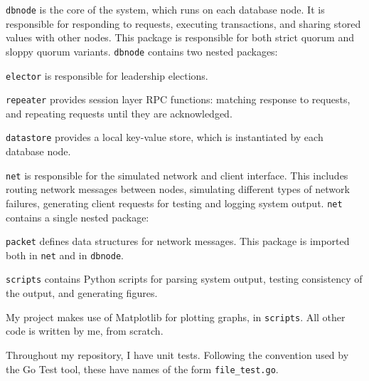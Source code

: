 \documentclass[12pt,a4paper,twoside,openany]{report}
\begin{document}
\begin{description}
  \item{\verb|dbnode|} is the core of the system, which runs on each database node. It is responsible for responding to requests, executing transactions, and sharing stored values with other nodes. This package is responsible for both strict quorum and sloppy quorum variants. \verb|dbnode| contains two nested packages:

  \begin{description}
    \item{\verb|elector|} is responsible for leadership elections.

    \item{\verb|repeater|} provides session layer RPC functions: matching response to requests, and repeating requests until they are acknowledged.

  \end{description}

  \item{\verb|datastore|} provides a local key-value store, which is instantiated by each database node.

  \item{\verb|net|} is responsible for the simulated network and client interface. This includes routing network messages between nodes, simulating different types of network failures, generating client requests for testing and logging system output. \verb|net| contains a single nested package:

  \begin{description}
    \item
    \item{\verb|packet|} defines data structures for network messages. This package is imported both in \verb|net| and in \verb|dbnode|.

  \end{description}

  \item{\verb|scripts|} contains Python scripts for parsing system output, testing consistency of the output, and generating figures.

\end{description}

My project makes use of Matplotlib for plotting graphs, in \verb|scripts|. All other code is written by me, from scratch.

Throughout my repository, I have unit tests. Following the convention used by the Go Test tool, these have names of the form \verb|file_test.go|.
\end{document}
